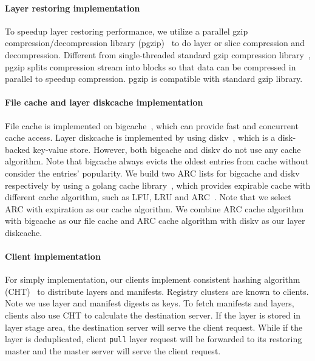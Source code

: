 \paragraph{Layer restoring implementation}
To speedup layer restoring performance,
we utilize a parallel gzip compression/decompression library (pgzip)~\cite{xxx} to do layer or slice compression and decompression.
Different from single-threaded standard gzip compression library~\cite{xxx},
pgzip splits compression stream into blocks so that data can be compressed in parallel to speedup compression.
pgzip is compatible with standard gzip library.

\paragraph{File cache and layer diskcache implementation}

File cache is implemented on bigcache~\cite{xxx}, which can provide fast and concurrent cache access.
Layer diskcache is implemented by using diskv~\cite{xxx}, which is a disk-backed key-value store.
However, both bigcache and diskv do not use any cache algorithm. 
Note that bigcache always evicts the oldest entries from cache without consider the entries' popularity.
We build two ARC lists for bigcache and diskv respectively by using a golang cache library~\cite{xxx}, 
which provides expirable cache with different cache algorithm, such as LFU, LRU and ARC~\cite{xxx}.
Note that we select ARC with expiration as our cache algorithm.
We combine ARC cache algorithm with bigcache as our file cache
and ARC cache algorithm with diskv as our layer diskcache.

\paragraph{Client implementation}
For simply implementation,
our clients implement consistent hashing algorithm (CHT)~\cite{xxx} to distribute layers and manifests.
Registry clusters are known to clients.
Note we use layer and manifest digests as keys.
To fetch manifests and layers, clients also use CHT to calculate the destination server.
If the layer is stored in layer stage area, the destination server will serve the client request.
While if the layer is deduplicated, client \texttt{pull} layer request will be forwarded to its restoring master
and the master server will serve the client request.


